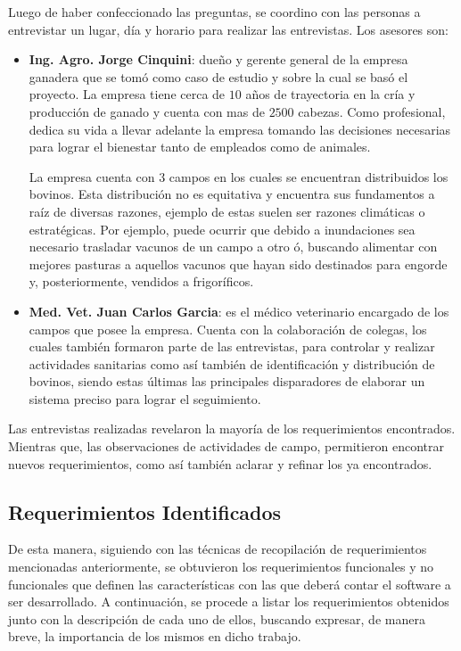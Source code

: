 \documentclass[11pt,oneside]{book}
\begin{document}
\newpage
Luego de haber confeccionado las preguntas, se coordino con las personas a entrevistar un lugar, día y horario para realizar las entrevistas. Los asesores son:
\begin{itemize}
\item \textbf{Ing. Agro. Jorge Cinquini}: dueño y gerente general de la empresa ganadera que se tomó como caso de estudio y sobre la cual se basó el proyecto. La empresa tiene cerca de $10$ años de trayectoria en la cría y producción de ganado y cuenta con mas de $2500$ cabezas. Como profesional, dedica su vida a llevar adelante la empresa tomando las decisiones necesarias para lograr el bienestar tanto de empleados como de animales. 

La empresa cuenta con $3$ campos en los cuales se encuentran distribuidos los bovinos. Esta distribución no es equitativa y encuentra sus fundamentos a raíz de diversas razones, ejemplo de estas suelen ser razones climáticas o estratégicas. Por ejemplo, puede ocurrir que debido a inundaciones sea necesario trasladar vacunos de un campo a otro ó, buscando alimentar con mejores pasturas a aquellos vacunos que hayan sido destinados para engorde y, posteriormente, vendidos a frigoríficos.

\item \textbf{Med. Vet. Juan Carlos Garcia}: es el médico veterinario encargado de los campos que posee la empresa. Cuenta con la colaboración de colegas, los cuales también formaron parte de las entrevistas, para controlar y realizar actividades sanitarias como así también de identificación y distribución de bovinos, siendo estas últimas las principales disparadores de elaborar un sistema preciso para lograr el seguimiento.
\end{itemize} 

Las entrevistas realizadas revelaron la mayoría de los requerimientos encontrados. Mientras que, las observaciones de actividades de campo, permitieron encontrar nuevos requerimientos, como así también aclarar y refinar los ya encontrados.

\subsection{Requerimientos Identificados}
De esta manera, siguiendo con las técnicas de recopilación de requerimientos mencionadas anteriormente, se obtuvieron los requerimientos funcionales y no funcionales que definen las características con las que deberá contar el software a ser desarrollado. A continuación, se procede a listar los requerimientos obtenidos junto con la descripción de cada uno de ellos, buscando expresar, de manera breve, la importancia de los mismos en dicho trabajo. 
\end{document}
